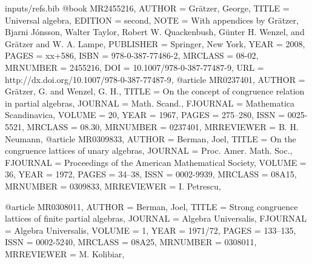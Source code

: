 \begin{filecontents*}{inputs/refs.bib}
@book {MR2455216,
    AUTHOR = {Gr{\"a}tzer, George},
     TITLE = {Universal algebra},
   EDITION = {second},
      NOTE = {With appendices by Gr{\"a}tzer, Bjarni J{\'o}nsson, Walter
              Taylor, Robert W. Quackenbush, G{\"u}nter H. Wenzel, and
              Gr{\"a}tzer and W. A. Lampe},
 PUBLISHER = {Springer, New York},
      YEAR = {2008},
     PAGES = {xx+586},
      ISBN = {978-0-387-77486-2},
   MRCLASS = {08-02},
  MRNUMBER = {2455216},
       DOI = {10.1007/978-0-387-77487-9},
       URL = {http://dx.doi.org/10.1007/978-0-387-77487-9},
}
@article {MR0237401,
    AUTHOR = {Gr{\"a}tzer, G. and Wenzel, G. H.},
     TITLE = {On the concept of congruence relation in partial algebras},
   JOURNAL = {Math. Scand.},
  FJOURNAL = {Mathematica Scandinavica},
    VOLUME = {20},
      YEAR = {1967},
     PAGES = {275--280},
      ISSN = {0025-5521},
   MRCLASS = {08.30},
  MRNUMBER = {0237401},
MRREVIEWER = {B. H. Neumann},
}
@article {MR0309833,
    AUTHOR = {Berman, Joel},
     TITLE = {On the congruence lattices of unary algebras},
   JOURNAL = {Proc. Amer. Math. Soc.},
  FJOURNAL = {Proceedings of the American Mathematical Society},
    VOLUME = {36},
      YEAR = {1972},
     PAGES = {34--38},
      ISSN = {0002-9939},
   MRCLASS = {08A15},
  MRNUMBER = {0309833},
MRREVIEWER = {I. Petrescu},
}
		
@article {MR0308011,
    AUTHOR = {Berman, Joel},
     TITLE = {Strong congruence lattices of finite partial algebras},
   JOURNAL = {Algebra Universalis},
  FJOURNAL = {Algebra Universalis},
    VOLUME = {1},
      YEAR = {1971/72},
     PAGES = {133--135},
      ISSN = {0002-5240},
   MRCLASS = {08A25},
  MRNUMBER = {0308011},
MRREVIEWER = {M. Kolibiar},
}
		

\end{filecontents*}
